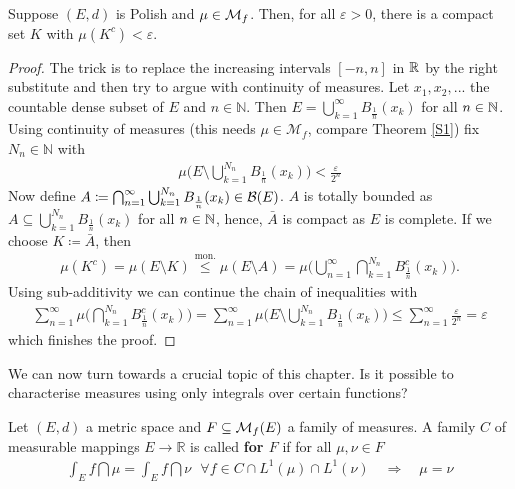 \begin{laussagewerkzeug}
\begin{prop}\label{prop_4120}
	Suppose $(E,d)$ is Polish and $\mu \in \mathcal{M}_f$. Then, for all $\varepsilon > 0$, there is a compact set $K$ with $\mu(K^c)<\varepsilon$.
\end{prop}
\end{laussagewerkzeug}
\begin{proof}[Proof]
	The trick is to replace the increasing intervals $[-n,n]$ in $\mathbb{R}$ by the right substitute and then try to argue with continuity of measures. Let $x_1,x_2,...$ the countable dense subset of $E$ and $n\in\mathbb{N}$. Then $E = \bigcup\limits_{k=1}^{\infty} B_{\frac{1}{n}}(x_k)$ for all $n\in\mathbb{N}$. Using continuity of measures (this needs $\mu\in \mathcal M_f$, compare Theorem \ref{S1}) fix $N_n \in \mathbb{N}$ with 
	\begin{align*}
		\mu \Big( E \text{\textbackslash} \bigcup\limits_{k=1}^{N_n}B_{\frac{1}{n}}(x_k)\Big) < \frac{\varepsilon}{2^n}
	\end{align*}
	Now define $A \coloneqq \bigcap_{n=1}^{\infty} \bigcup_{k=1}^{N_n}B_{\frac{1}{n}}(x_k) \in\mathcal{B}(E)$. $A$ is totally bounded as $A\subseteq \bigcup_{k=1}^{N_n} B_{\frac{1}{n}}(x_k)$ for all $n\in\mathbb{N}$, hence, $\bar{A}$ is compact as $E$ is complete. If we choose $K \coloneqq \bar{A}$, then
	\begin{align*}
		\mu (K^c) = \mu (E \text{\textbackslash} K ) 
				\overset{\text{mon.}}{\leq} \mu (E \text{\textbackslash} A ) 
				= \mu \Big( \bigcup_{n=1}^{\infty} \bigcap_{k=1}^{N_n}B_{\frac{1}{n}}^c (x_k) \Big).
	\end{align*}			
	Using sub-additivity we can continue the chain of inequalities with
	\begin{align*}
				\sum\limits_{n=1}^{\infty} \mu \Big( \bigcap\limits_{k=1}^{N_n} B_{\frac{1}{n}}^c (x_k) \Big) 
				= \sum\limits_{n=1}^{\infty} \mu \Big( E \text{\textbackslash} \bigcup\limits_{k=1}^{N_n} B_{\frac{1}{n}}(x_k) \Big)
				\leq \sum\limits_{n=1}^{\infty}\frac{\varepsilon}{2^n}
				= \varepsilon
	\end{align*}
	which finishes the proof.
\end{proof}
We can now turn towards a crucial topic of this chapter. Is it possible to characterise measures using only integrals over certain functions?
\begin{ldef}
\begin{deff}
	Let $(E,d)$ a metric space and $F \subseteq \mathcal{M}_f(E)$ a family of measures. A family $C$ of measurable mappings $E \to \mathbb{R}$ is called \textbf{ for $F$} if for all $\mu,\nu \in F$
	\begin{align*}
		\int_E f\dint \mu = \int_E f\dint \nu \:\:\: \forall f \in C \cap L^1(\mu)\cap L^1(\nu)\quad \Rightarrow \quad \mu = \nu
	\end{align*}
\end{deff}
\end{ldef}
